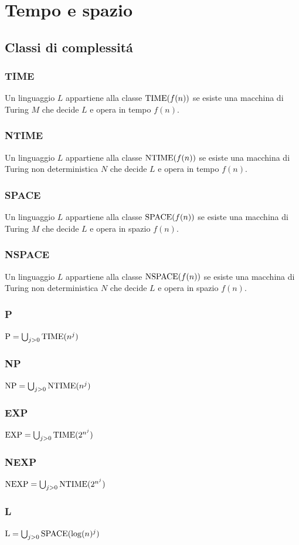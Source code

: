 \section{Tempo e spazio}


\subsection{Classi di complessitá}
\subsubsection{TIME}
Un linguaggio $L$ appartiene alla classe $\text{TIME}(f(n))$ se esiste una macchina di Turing $M$ che decide $L$ e opera in tempo $f(n)$.
\subsubsection{NTIME}
Un linguaggio $L$ appartiene alla classe $\text{NTIME}(f(n))$ se esiste una macchina di Turing non deterministica $N$ che decide $L$ e opera in tempo $f(n)$.
\subsubsection{SPACE}
Un linguaggio $L$ appartiene alla classe $\text{SPACE}(f(n))$ se esiste una macchina di Turing $M$ che decide $L$ e opera in spazio $f(n)$.
\subsubsection{NSPACE}
Un linguaggio $L$ appartiene alla classe $\text{NSPACE}(f(n))$ se esiste una macchina di Turing non deterministica $N$ che decide $L$ e opera in spazio $f(n)$.
\subsubsection{P}
$\text{P} = \bigcup_{j>0} \text{TIME}(n^j)$
\subsubsection{NP}
$\text{NP} = \bigcup_{j>0} \text{NTIME}(n^j)$
\subsubsection{EXP}
$\text{EXP} = \bigcup_{j>0} \text{TIME}(2^{n^j})$
\subsubsection{NEXP}
$\text{NEXP} = \bigcup_{j>0} \text{NTIME}(2^{n^j})$
\subsubsection{L}
$\text{L} = \bigcup_{j>0} \text{SPACE}(\log(n)^j)$
